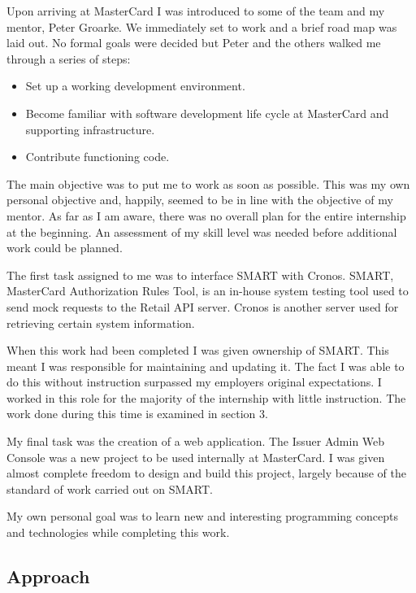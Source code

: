 \documentclass[a4paper, 11pt, titlepage]{article}
\begin{document}
Upon arriving at MasterCard I was introduced to some of the team and my mentor, Peter Groarke. We immediately set to work and a brief road map was laid out. No formal goals were decided but Peter and the others walked me through a series of steps: 
\begin{itemize} 
\item Set up a working development environment. 
\item Become familiar with software development life cycle at MasterCard and supporting infrastructure. 
\item Contribute functioning code. 
\end{itemize} 
The main objective was to put me to work as soon as possible. This was my own personal objective and, happily, seemed to be in line with the objective of my mentor. As far as I am aware, there was no overall plan for the entire internship at the beginning. An assessment of my skill level was needed before additional work could be planned. 
 
The first task assigned to me was to interface SMART with Cronos. SMART, MasterCard Authorization Rules Tool, is an in-house system testing tool used to send mock requests to the Retail API server. Cronos is another server used for retrieving certain system information.
	
When this work had been completed I was given ownership of SMART. This meant I was responsible for maintaining and updating it. The fact I was able to do this without instruction surpassed my employers original expectations. I worked in this role for the majority of the internship with little instruction. The work done during this time is examined in section 3.

My final task was the creation of a web application. The Issuer Admin Web Console was a new project to be used internally at MasterCard. I was given almost complete freedom to design and build this project, largely because of the standard of work carried out on SMART.

My own personal goal was to learn new and interesting programming concepts and technologies while completing this work.

 
\subsection{Approach} 
\end{document}
